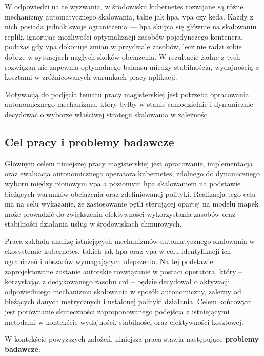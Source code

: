 W odpowiedzi na te wyzwania, w środowisku \Gls{kubernetes} rozwijane są różne mechanizmy automatycznego skalowania, takie jak \Gls{hpa}, \Gls{vpa} czy \Gls{keda}. Każdy z nich posiada jednak swoje ograniczenia — \Gls{hpa} skupia się głównie na skalowaniu replik, ignorując możliwości optymalizacji zasobów pojedynczego kontenera, podczas gdy \Gls{vpa} dokonuje zmian w przydziale zasobów, lecz nie radzi sobie dobrze w sytuacjach nagłych skoków obciążenia. W rezultacie żadne z tych rozwiązań nie zapewnia optymalnego balansu między stabilnością, wydajnością a kosztami w zróżnicowanych warunkach pracy aplikacji.

Motywacją do podjęcia tematu pracy magisterskiej jest potrzeba opracowania autonomicznego mechanizmu, który byłby w stanie samodzielnie i dynamicznie decydować o wyborze właściwej strategii skalowania w zależnośc

\subsection{Cel pracy i problemy badawcze}

Głównym celem niniejszej pracy magisterskiej jest opracowanie, implementacja oraz ewaluacja autonomicznego operatora \Gls{kubernetes}, zdolnego do dynamicznego wyboru między pionowym \Gls{vpa} a poziomym \Gls{hpa} skalowaniem na podstawie bieżących warunków obciążenia oraz zdefiniowanej polityki. Realizacja tego celu ma na celu wykazanie, że zastosowanie pętli sterującej opartej na modelu \Gls{mapek} może prowadzić do zwiększenia efektywności wykorzystania zasobów oraz stabilności działania usług w środowiskach chmurowych.

Praca zakłada analizę istniejących mechanizmów automatycznego skalowania w ekosystemie \Gls{kubernetes}, takich jak \Gls{hpa} oraz \Gls{vpa} w celu identyfikacji ich ograniczeń i obszarów wymagających ulepszenia. Na tej podstawie zaprojektowane zostanie autorskie rozwiązanie w postaci operatora, który – korzystając z dedykowanego zasobu \Gls{crd} – będzie decydował o aktywacji odpowiedniego mechanizmu skalowania w sposób autonomiczny, zależny od bieżących danych metrycznych i ustalonej polityki działania. Celem końcowym jest porównanie skuteczności zaproponowanego podejścia z istniejącymi metodami w kontekście wydajności, stabilności oraz efektywności kosztowej.

W kontekście powyższych założeń, niniejsza praca stawia następujące \textbf{problemy badawcze}:

